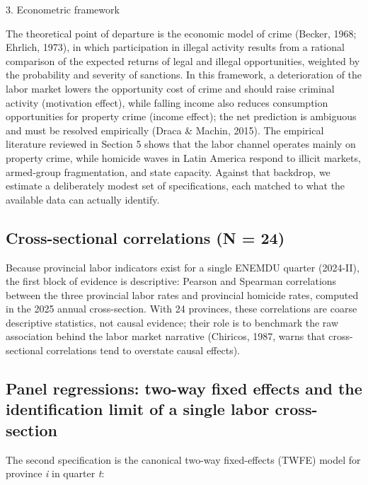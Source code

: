 3. Econometric framework


The theoretical point of departure is the economic model of crime (Becker, 1968; Ehrlich, 1973), in which participation in illegal activity results from a rational comparison of the expected returns of legal and illegal opportunities, weighted by the probability and severity of sanctions. In this framework, a deterioration of the labor market lowers the opportunity cost of crime and should raise criminal activity (motivation effect), while falling income also reduces consumption opportunities for property crime (income effect); the net prediction is ambiguous and must be resolved empirically (Draca \& Machin, 2015). The empirical literature reviewed in Section 5 shows that the labor channel operates mainly on property crime, while homicide waves in Latin America respond to illicit markets, armed-group fragmentation, and state capacity. Against that backdrop, we estimate a deliberately modest set of specifications, each matched to what the available data can actually identify.



\subsection{Cross-sectional correlations (N = 24)}



Because provincial labor indicators exist for a single ENEMDU quarter (2024-II), the first block of evidence is descriptive: Pearson and Spearman correlations between the three provincial labor rates and provincial homicide rates, computed in the 2025 annual cross-section. With 24 provinces, these correlations are coarse descriptive statistics, not causal evidence; their role is to benchmark the raw association behind the labor market narrative (Chiricos, 1987, warns that cross-sectional correlations tend to overstate causal effects).



\subsection{Panel regressions: two-way fixed effects and the identification limit of a single labor cross-section}



The second specification is the canonical two-way fixed-effects (TWFE) model for province \textit{i} in quarter \textit{t}:



